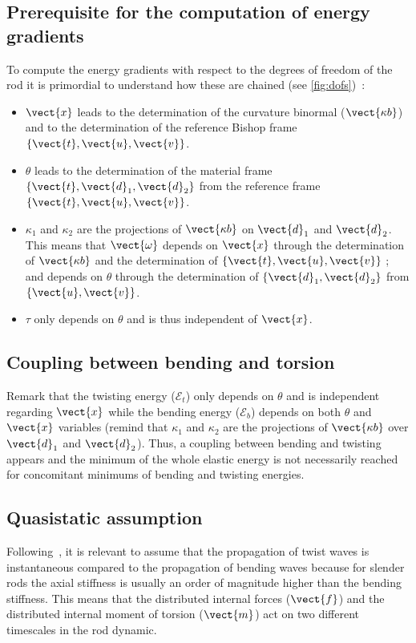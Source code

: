 \subsection{Prerequisite for the computation of energy gradients}\label{sec=dofchain}
To compute the energy gradients with respect to the degrees of freedom of the rod it is primordial to understand how these \dofs{} are chained (see \cref{fig:dofs})~:


\begin{itemize}
\item
$\vect{x}$ leads to the determination of the curvature binormal ($\vect{\kappa b}$) and to the determination of the reference Bishop frame $\{\vect{t},\vect{u},\vect{v}\}$.
\item
$\theta$ leads to the determination of the material frame $\{\vect{t},\vect{d}_1,\vect{d}_2\}$ from the reference frame $\{\vect{t},\vect{u},\vect{v}\}$.
\item
$\kappa_1$ and $\kappa_2$ are the projections of $\vect{\kappa b}$ on $\vect{d}_1$ and $\vect{d}_2$. This means that $\vect{\omega}$ depends on $\vect{x}$ through the determination of $\vect{\kappa b}$ and the determination of $\{\vect{t},\vect{u},\vect{v}\}$ ; and depends on $\theta$ through the determination of $\{\vect{d}_1, \vect{d}_2\}$ from $\{\vect{u}, \vect{v}\}$.
\item
$\tau$ only depends on $\theta$ and is thus independent of $\vect{x}$.
\end{itemize}


\subsection{Coupling between bending and torsion}
Remark that the twisting energy ($\mathcal{E}_{t}$) only depends on $\theta$ and is independent regarding $\vect{x}$ while the bending energy ($\mathcal{E}_{b}$) depends on both $\theta$ and $\vect{x}$ variables (remind that $\kappa_1$ and $\kappa_2$ are the projections of $\vect{\kappa b}$ over $\vect{d}_1$ and $\vect{d}_2$). Thus, a coupling between bending and twisting appears and the minimum of the whole elastic energy is not necessarily reached for concomitant minimums of bending and twisting energies.

\subsection{Quasistatic assumption}
Following~, it is relevant to assume that the propagation of twist waves is instantaneous compared to the propagation of bending waves because for slender rods the axial stiffness is usually an order of magnitude higher than the bending stiffness. This means that the distributed internal forces ($\vect{f}$) and the  distributed internal moment of torsion ($\vect{m}$) act on two different timescales in the rod dynamic.

